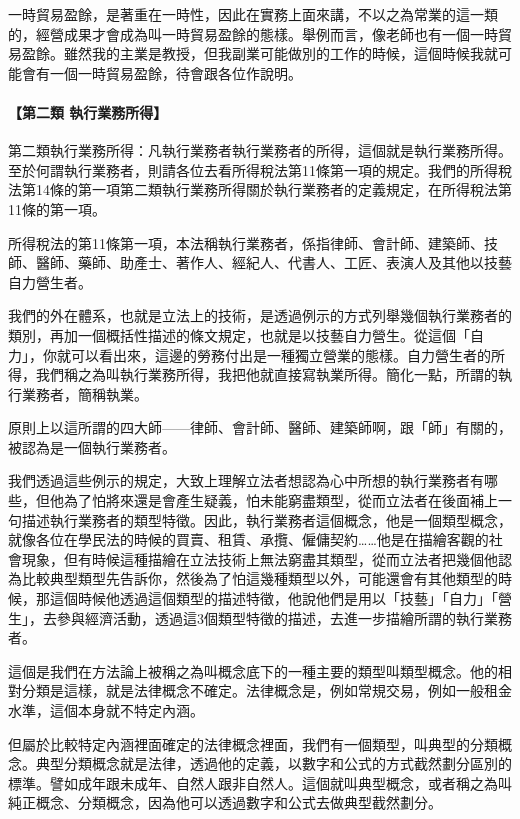\documentclass[oneside,sub3section]{ctexbook}
\let\oldparagraph\paragraph
\renewcommand{\paragraph}[1]{\oldparagraph{#1}\mbox{}}
\begin{document}
一時貿易盈餘，是著重在一時性，因此在實務上面來講，不以之為常業的這一類的，經營成果才會成為叫一時貿易盈餘的態樣。舉例而言，像老師也有一個一時貿易盈餘。雖然我的主業是教授，但我副業可能做別的工作的時候，這個時候我就可能會有一個一時貿易盈餘，待會跟各位作說明。

\hypertarget{ux7b2cux4e8cux985e-ux57f7ux884cux696dux52d9ux6240ux5f97}{%
\paragraph{【第二類 執行業務所得】}\label{ux7b2cux4e8cux985e-ux57f7ux884cux696dux52d9ux6240ux5f97}}

第二類執行業務所得：凡執行業務者執行業務者的所得，這個就是執行業務所得。至於何謂執行業務者，則請各位去看所得稅法第11條第一項的規定。我們的所得稅法第14條的第一項第二類執行業務所得關於執行業務者的定義規定，在所得稅法第11條的第一項。

所得稅法的第11條第一項，本法稱執行業務者，係指律師、會計師、建築師、技師、醫師、藥師、助產士、著作人、經紀人、代書人、工匠、表演人及其他以技藝自力營生者。

我們的外在體系，也就是立法上的技術，是透過例示的方式列舉幾個執行業務者的類別，再加一個概括性描述的條文規定，也就是以技藝自力營生。從這個「自力」，你就可以看出來，這邊的勞務付出是一種獨立營業的態樣。自力營生者的所得，我們稱之為叫執行業務所得，我把他就直接寫執業所得。簡化一點，所謂的執行業務者，簡稱執業。

原則上以這所謂的四大師------律師、會計師、醫師、建築師啊，跟「師」有關的，被認為是一個執行業務者。

我們透過這些例示的規定，大致上理解立法者想認為心中所想的執行業務者有哪些，但他為了怕將來還是會產生疑義，怕未能窮盡類型，從而立法者在後面補上一句描述執行業務者的類型特徵。因此，執行業務者這個概念，他是一個類型概念，就像各位在學民法的時候的買賣、租賃、承攬、僱傭契約\ldots\ldots 他是在描繪客觀的社會現象，但有時候這種描繪在立法技術上無法窮盡其類型，從而立法者把幾個他認為比較典型類型先告訴你，然後為了怕這幾種類型以外，可能還會有其他類型的時候，那這個時候他透過這個類型的描述特徵，他說他們是用以「技藝」「自力」「營生」，去參與經濟活動，透過這3個類型特徵的描述，去進一步描繪所謂的執行業務者。

這個是我們在方法論上被稱之為叫概念底下的一種主要的類型叫類型概念。他的相對分類是這樣，就是法律概念不確定。法律概念是，例如常規交易，例如一般租金水準，這個本身就不特定內涵。

但屬於比較特定內涵裡面確定的法律概念裡面，我們有一個類型，叫典型的分類概念。典型分類概念就是法律，透過他的定義，以數字和公式的方式截然劃分區別的標準。譬如成年跟未成年、自然人跟非自然人。這個就叫典型概念，或者稱之為叫純正概念、分類概念，因為他可以透過數字和公式去做典型截然劃分。
\end{document}
